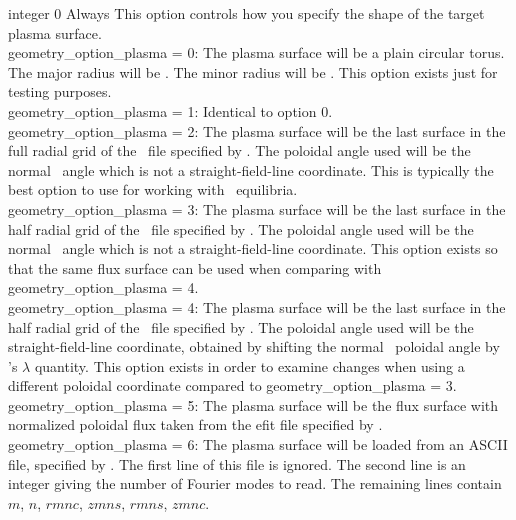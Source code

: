 {integer}
{0}
{Always}
{This option controls how you specify the shape of the target plasma surface.\\

{\ttfamily geometry\_option\_plasma} = 0: The plasma surface will be a plain circular torus. The major radius will be .
     The minor radius will be . This option exists just for testing purposes.\\

{\ttfamily geometry\_option\_plasma} = 1: Identical to option 0.\\

{\ttfamily geometry\_option\_plasma} = 2: The plasma surface will be the last surface in the full radial grid of the \vmec~file specified by .
The poloidal angle used will be the normal \vmec~angle which is not a straight-field-line coordinate.
This is typically the best option to use for working with \vmec~equilibria.\\

{\ttfamily geometry\_option\_plasma} = 3: The plasma surface will be the last surface in the half radial grid of the \vmec~file specified by .
The poloidal angle used will be the normal \vmec~angle which is not a straight-field-line coordinate.
This option exists so that the same flux surface can be used when comparing with {\ttfamily geometry\_option\_plasma} = 4.\\

{\ttfamily geometry\_option\_plasma} = 4: The plasma surface will be the last surface in the half radial grid of the \vmec~file specified by .
The poloidal angle used will be the straight-field-line coordinate, obtained by shifting the normal \vmec~poloidal angle by \vmec's $\lambda$ quantity.
This option exists in order to examine changes when using a different poloidal coordinate compared to {\ttfamily geometry\_option\_plasma} = 3.\\

{\ttfamily geometry\_option\_plasma} = 5: The plasma surface will be the flux surface with normalized poloidal flux
 taken from the {\ttfamily efit} file specified by . \\

{\ttfamily geometry\_option\_plasma} = 6: The plasma surface will be loaded from an ASCII file, specified by . The first line of this file is ignored. The second line is an integer giving the number of Fourier modes
to read. The remaining lines contain $m$, $n$, $rmnc$, $zmns$, $rmns$, $zmnc$.
}

